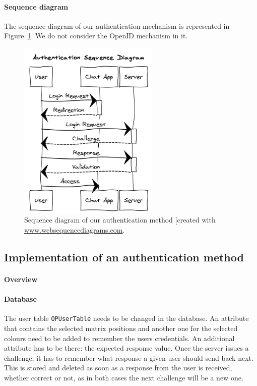 \documentclass[11pt,a4paper]{article}
\begin{document}
\paragraph{Sequence diagram} The sequence diagram of our authentication mechanism is represented in Figure~\ref{fig:seqdia}. We do not consider the OpenID mechanism in it.
\begin{figure}
\centering
\includegraphics[width=0.6\textwidth]{seqdia.png}
\caption{Sequence diagram of our authentication method [created with \url{www.websequencediagrams.com}.}
\label{fig:seqdia}
\end{figure}

\clearpage

\subsection*{Implementation of an authentication method}
\paragraph{Overview}

\paragraph{Database}
The user table \texttt{OPUserTable} needs to be changed in the database.
An attribute that contains the selected matrix positions and another one for the selected colours need to be added to remember the users credentials.
An additional attribute has to be there: the expected response value. Once the server issues a challenge, it has to remember what response a given user should send back next. This is stored and deleted as soon as a response from the user is received, whether correct or not, as in both cases the next challenge will be a new one.
\end{document}
